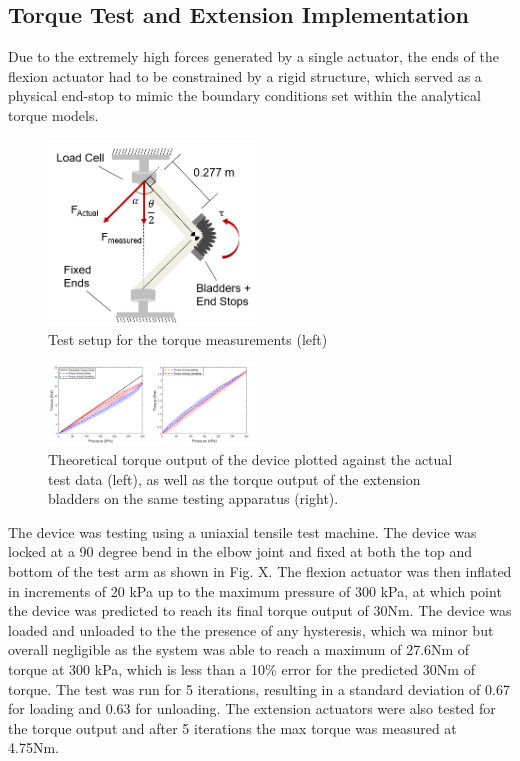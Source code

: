 \documentclass[letterpaper, 10 pt, conference]{ieeeconf}  %
\begin{document}
\subsection{Torque Test and Extension Implementation}

Due to the extremely high forces generated by a single actuator, the ends of the flexion actuator had to be constrained by a rigid structure, which served as a physical end-stop to mimic the boundary conditions set within the analytical torque models.  


\begin{figure}
\centering
\includegraphics[width=0.5\textwidth]{torquetest.PNG}
\caption{Test setup for the torque measurements (left)}
\label{fig:stifftest}
\end{figure}

\begin{figure}
\centering
\includegraphics[width=0.5\textwidth]{torque.PNG}
\caption{Theoretical torque output of the device plotted against the actual test data (left), as well as the torque output of the extension bladders on the same testing apparatus (right).}
\label{fig:stifftest}
\end{figure}

The device was testing using a uniaxial tensile test machine.  The device was locked at a 90 degree bend in the elbow joint and fixed at both the top and bottom of the test arm as shown in Fig. X.  The flexion actuator was then inflated in increments of 20 kPa up to the maximum pressure of 300 kPa, at which point the device was predicted to reach its final torque output of 30Nm.  The device was loaded and unloaded to the the presence of any hysteresis, which wa minor but overall negligible as the system was able to reach a maximum of 27.6Nm of torque at 300 kPa, which is less than a 10\% error for the predicted 30Nm of torque.  The test was run for 5 iterations, resulting in a standard deviation of 0.67 for loading and 0.63 for unloading.  The extension actuators were also tested for the torque output and after 5 iterations the max torque was measured at 4.75Nm. 
\end{document}
